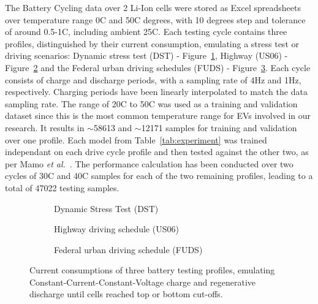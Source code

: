 %
The Battery Cycling data over 2 Li-Ion cells were stored as Excel spreadsheets over temperature range 0\textdegree{}C and 50\textdegree{}C degrees, with 10 degrees step and tolerance of around 0.5-1\textdegree{}C, including ambient 25\textdegree{}C.
Each testing cycle contains three profiles, distinguished by their current consumption, emulating a stress test or driving scenarios: Dynamic stress test (DST) - Figure~\ref{subfig:profs-DST}, Highway (US06) - Figure~\ref{subfig:profs-US} and the Federal urban driving schedules (FUDS) - Figure~\ref{subfig:profs-FUDS}.
Each cycle consists of charge and discharge periods, with a sampling rate of 4Hz and 1Hz, respectively.
Charging periods have been linearly interpolated to match the data sampling rate.
The range of 20\textdegree{}C to 50\textdegree{}C was used as a training and validation dataset since this is the most common temperature range for EVs involved in our research.
It results in $\sim$58613 and $\sim$12171 samples for training and validation over one profile.
Each model from \mbox{Table~\ref{tab:experiment}} was trained independant on each drive cycle profile and then tested against the other two, as per Mamo \textit{et al.}~\cite{mamo_long_2020}.
The performance calculation has been conducted over two cycles of 30\textdegree{}C and 40\textdegree{}C samples for each of the two remaining profiles, leading to a total of 47022 testing samples.
\begin{figure*}[htbp]
    \centering
    \begin{subfigure}[b]{0.28\textheight}
        \centering
        
        \caption{Dynamic Stress Test (DST)}
        \label{subfig:profs-DST}
    \end{subfigure}
    \hfill
    \begin{subfigure}[b]{0.28\textheight}
        \centering
        
        \caption{Highway driving schedule (US06)}
        \label{subfig:profs-US}
    \end{subfigure}
    \hfill
    \begin{subfigure}[b]{0.28\textheight}
        \centering
        
        \caption{Federal urban driving schedule (FUDS)}
        \label{subfig:profs-FUDS}
    \end{subfigure}
    \caption{Current consumptions of three battery testing profiles, emulating Constant-Current-Constant-Voltage charge and regenerative discharge until cells reached top or bottom cut-offs.}
    \label{fig:current-profs}
\end{figure*}
